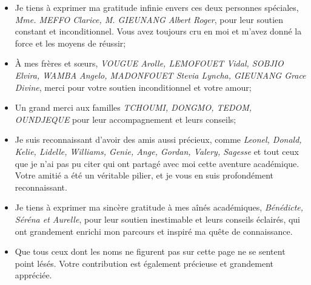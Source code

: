 \begin{itemize}
    \item Je tiens à exprimer ma gratitude infinie envers ces deux personnes spéciales, \textit{Mme. MEFFO Clarice,  M. GIEUNANG Albert Roger}, pour leur soutien constant et inconditionnel. Vous avez toujours cru en moi et m'avez donné la force et les moyens de réussir;
    \item À mes frères et sœurs, \textit{VOUGUE Arolle, LEMOFOUET Vidal, SOBJIO Elvira, WAMBA Angelo, MADONFOUET Stevia Lyncha, GIEUNANG Grace Divine}, merci pour votre soutien inconditionnel et votre amour; 
    \item Un grand merci aux familles \textit{TCHOUMI, DONGMO, TEDOM, OUNDJEQUE} pour leur accompagnement et leurs conseils;
    \item Je suis reconnaissant d'avoir des amis aussi précieux, comme \textit{Leonel, Donald, Kelie, Lidelle, Williams, Genie, Ange, Gordan, Valery, Sagesse} et tout ceux que je n'ai pas pu citer qui ont partagé avec moi cette aventure académique. Votre amitié a été un véritable pilier, et je vous en suis profondément reconnaissant.
    \item Je tiens à exprimer ma sincère gratitude à mes aînés académiques, \textit{Bénédicte, Séréna et Aurelle}, pour leur soutien inestimable et leurs conseils éclairés, qui ont grandement enrichi mon parcours et inspiré ma quête de connaissance.
    \item Que tous ceux dont les noms ne figurent pas sur cette page ne se sentent point lésés. Votre contribution est également précieuse et grandement appréciée.
\end{itemize}

\myCleanStarChapterEnd
